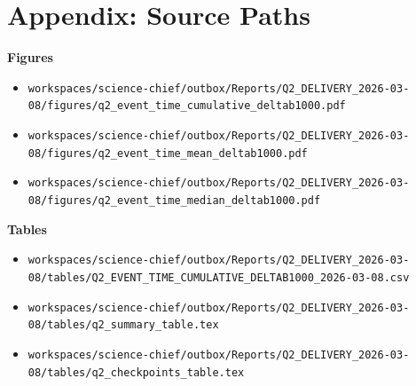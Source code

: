 \documentclass[11pt,a4paper]{article}
\begin{document}
\section*{Appendix: Source Paths}
\textbf{Figures}\\
\begin{itemize}
\item \texttt{workspaces/science-chief/outbox/Reports/Q2\_DELIVERY\_2026-03-08/figures/q2\_event\_time\_cumulative\_deltab1000.pdf}
\item \texttt{workspaces/science-chief/outbox/Reports/Q2\_DELIVERY\_2026-03-08/figures/q2\_event\_time\_mean\_deltab1000.pdf}
\item \texttt{workspaces/science-chief/outbox/Reports/Q2\_DELIVERY\_2026-03-08/figures/q2\_event\_time\_median\_deltab1000.pdf}
\end{itemize}
\textbf{Tables}\\
\begin{itemize}
\item \texttt{workspaces/science-chief/outbox/Reports/Q2\_DELIVERY\_2026-03-08/tables/Q2\_EVENT\_TIME\_CUMULATIVE\_DELTAB1000\_2026-03-08.csv}
\item \texttt{workspaces/science-chief/outbox/Reports/Q2\_DELIVERY\_2026-03-08/tables/q2\_summary\_table.tex}
\item \texttt{workspaces/science-chief/outbox/Reports/Q2\_DELIVERY\_2026-03-08/tables/q2\_checkpoints\_table.tex}
\end{itemize}
\end{document}

